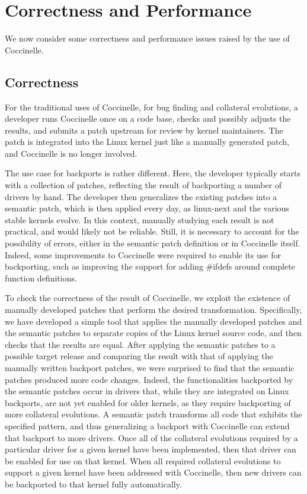 \section{Correctness and Performance}
\label{correct}

We now consider some correctness and performance issues raised by the use
of Coccinelle.

\subsection{Correctness}

For the traditional uses of Coccinelle, for bug finding and collateral
evolutions, a developer runs Coccinelle once on a code base, checks and
possibly adjusts the results, and submits a patch upstream for review by
kernel maintainers.  The patch is integrated into the Linux kernel just
like a manually generated patch, and Coccinelle is no longer involved.

The use case for backports is rather different.  Here, the developer
typically starts with a collection of patches, reflecting the result of
backporting a number of drivers by hand.  The developer then generalizes
the existing patches into a semantic patch, which is then applied every
day, as linux-next and the various stable kernels evolve.  In this context,
manually studying each result is not practical, and would likely not be
reliable.  Still, it is necessary to account for the possibility of errors,
either in the semantic patch definition or in Coccinelle itself.  Indeed,
some improvements to Coccinelle were required to enable its use for
backporting, such as improving the support for adding \#ifdefs around
complete function definitions.

To check the correctness of the result of Coccinelle, we exploit the
existence of manually developed patches that perform the desired
transformation.  Specifically, we have developed a simple tool that applies
the manually developed patches and the semantic patches to separate copies
of the Linux kernel source code, and then checks that the results are
equal.
%
After applying the semantic patches to a possible target release and
comparing the result with that of applying the manually written backport
patches, we were surprised to find that the semantic patches produced more
code changes.  Indeed, the functionalities backported by the semantic
patches occur in drivers that, while they are integrated on Linux
backports, are not yet enabled for older kernels, as they require
backporting of more collateral evolutions. A semantic patch transforms all
code that exhibits the specified pattern, and thus generalizing a backport
with Coccinelle can extend that backport to more drivers. Once all of the
collateral evolutions required by a particular driver for a given kernel
have been implemented, then that driver can be enabled for use on that
kernel.  When all required collateral evolutions to support a given kernel
have been addressed with Coccinelle, then new drivers can be backported to
that kernel fully automatically.

